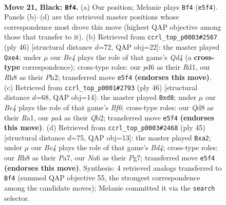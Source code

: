 \documentclass[11pt]{article}
\begin{document}
\clearpage

\begin{figure}[p]\centering
\begin{subfigure}{0.46\textwidth}\centering
\resizebox{\linewidth}{!}{%
\newchessgame
\chessboard[
  setfen={r2q1k1r/3p3p/n2P4/2pQb3/P5P1/2N5/1P6/R3KR2 b Q - 3 21},
  showmover=false,
  pgfstyle=straightmove, color=movearrow, markmove={e5-f4}
]}
\caption{}
\end{subfigure}\hfill
\begin{subfigure}{0.46\textwidth}\centering
\resizebox{\linewidth}{!}{%
\newchessgame
\chessboard[
  setfen={r3k3/7p/1p2pr2/1pn1N3/3Qq3/8/PP2KP1P/3R3R w q - 2 24},
  showmover=false,
  pgfstyle=straightmove, color=movearrow, markmove={d4-e4}
]}
\caption{}
\end{subfigure}
\\[4pt]
\begin{subfigure}{0.46\textwidth}\centering
\resizebox{\linewidth}{!}{%
\newchessgame
\chessboard[
  setfen={3rr1k1/pp3pp1/5B1p/8/Pb6/5qPP/1Q3P2/R1R3K1 w - - 0 24},
  showmover=false,
  pgfstyle=straightmove, color=movearrow, markmove={f6-d8}
]}
\caption{}
\end{subfigure}\hfill
\begin{subfigure}{0.46\textwidth}\centering
\resizebox{\linewidth}{!}{%
\newchessgame
\chessboard[
  setfen={r2q2k1/pp4p1/7p/3bQp2/8/5P1P/PPB2P2/4R1K1 b - - 1 23},
  showmover=false,
  pgfstyle=straightmove, color=movearrow, markmove={d5-a2}
]}
\caption{}
\end{subfigure}
\caption{\textbf{Move 21, Black: \texttt{Bf4}.} (a) Our position; Melanie plays \texttt{Bf4} (\texttt{e5f4}). Panels (b)--(d) are the retrieved master positions whose correspondence most drove this move (highest QAP objective among those that transfer to it). (b) Retrieved from \texttt{ccrl\_top\_p0003\#2567} (ply 46) [structural distance $d$=72, QAP obj=22]: the master played \texttt{Qxe4}; under $\mu$ our \emph{Be4} plays the role of that game's \emph{Qd4} (a \textbf{cross-type} correspondence); cross-type roles: our \emph{p}d6 as their \emph{R}d1, our \emph{R}h8 as their \emph{P}h2; transferred move \texttt{e5f4} \textbf{(endorses this move)}. (c) Retrieved from \texttt{ccrl\_top\_p0001\#2793} (ply 46) [structural distance $d$=68, QAP obj=14]: the master played \texttt{Bxd8}; under $\mu$ our \emph{Be4} plays the role of that game's \emph{Bf6}; cross-type roles: our \emph{Q}d8 as their \emph{R}a1, our \emph{p}a4 as their \emph{Q}b2; transferred move \texttt{e5f4} \textbf{(endorses this move)}. (d) Retrieved from \texttt{ccrl\_top\_p0003\#2468} (ply 45) [structural distance $d$=75, QAP obj=13]: the master played \texttt{Bxa2}; under $\mu$ our \emph{Be4} plays the role of that game's \emph{Bd4}; cross-type roles: our \emph{R}h8 as their \emph{P}a7, our \emph{N}a6 as their \emph{P}g7; transferred move \texttt{e5f4} \textbf{(endorses this move)}. Synthesis: 4 retrieved analogs transferred to \texttt{Bf4} (summed QAP objective 55, the strongest correspondence among the candidate moves); Melanie committed it via the \texttt{search} selector.}
\label{fig:thought-m41}
\end{figure}
\end{document}
